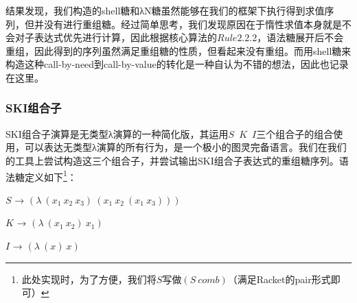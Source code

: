 结果发现，我们构造的shell糖和λN糖虽然能够在我们的框架下执行得到求值序列，但并没有进行重组糖。经过简单思考，我们发现原因在于惰性求值本身就是不会对子表达式优先进行计算，因此根据核心算法的$Rule2.2.2$，语法糖展开后不会重组，因此得到的序列虽然满足重组糖的性质，但看起来没有重组。而用shell糖来构造这种call-by-need到call-by-value的转化是一种自认为不错的想法，因此也记录在这里。

\subsubsection{SKI组合子}

SKI组合子演算是无类型λ演算的一种简化版，其运用$S$~$K$~$I$三个组合子的组合使用，可以表达无类型λ演算的所有行为，是一个极小的图灵完备语言。我们在我们的工具上尝试构造这三个组合子，并尝试输出SKI组合子表达式的重组糖序列。语法糖定义如下\footnote{此处实现时，为了方便，我们将$S$写做$(S~comb)$（满足Racket的pair形式即可）}：

\begin{flushleft}
	$S$ → $(\lambda~(x_{1}~x_{2}~x_{3})~(x_{1}~x_{2}~(x_{1}~x_{3})))$
	
	$K$ → $(\lambda~(x_{1}~x_{2})~x_{1})$
	
	$I$ → $(\lambda~(x)~x)$
\end{flushleft}

